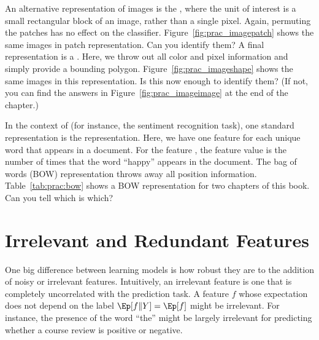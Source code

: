 An alternative representation of images is the , where the unit of interest is a small rectangular
block of an image, rather than a single pixel.  Again, permuting the
patches has no effect on the classifier.
Figure~\ref{fig:prac_imagepatch} shows the same images in patch
representation.  Can you identify them?  A final representation is a
.  Here, we throw out all color and
pixel information and simply provide a bounding polygon.
Figure~\ref{fig:prac_imageshape} shows the same images in this
representation.  Is this now enough to identify them?  (If not, you
can find the answers in Figure~\ref{fig:prac_imageimage} at the end of the chapter.)






In the context of  (for instance, the
sentiment recognition task), one standard representation is the
 representation.  Here, we have one feature for
each unique word that appears in a document.  For the feature
, the feature value is the number of times that the word
``happy'' appears in the document.  The bag of words (BOW)
representation throws away all position information.
Table~\ref{tab:prac:bow} shows a BOW representation for two chapters of this book.
Can you tell which is
which?

\section{Irrelevant and Redundant Features}

One big difference between learning models is how robust they are to
the addition of noisy or irrelevant features.  Intuitively, an
irrelevant feature is one that is completely uncorrelated with the
prediction task.  A feature $f$ whose expectation does not depend on
the label $\Ep[f \| Y] = \Ep[f]$ might be irrelevant.  For instance,
the presence of the word ``the'' might be largely irrelevant for
predicting whether a course review is positive or negative.

